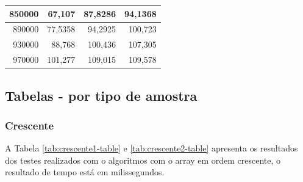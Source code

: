 \documentclass[a4paper, 12pt]{article}
\begin{document}
\begin{longtable}[c]{@{}rrrr@{}}
	\multicolumn{1}{|r|}{850000}                  & \multicolumn{1}{r|}{67,107}                 & \multicolumn{1}{r|}{87,8286}                & \multicolumn{1}{r|}{94,1368}                \\* \midrule
	\multicolumn{1}{|r|}{890000}                  & \multicolumn{1}{r|}{77,5358}                & \multicolumn{1}{r|}{94,2925}                & \multicolumn{1}{r|}{100,723}                \\* \midrule
	\multicolumn{1}{|r|}{930000}                  & \multicolumn{1}{r|}{88,768}                 & \multicolumn{1}{r|}{100,436}                & \multicolumn{1}{r|}{107,305}                \\* \midrule
	\multicolumn{1}{|r|}{970000}                  & \multicolumn{1}{r|}{101,277}                & \multicolumn{1}{r|}{109,015}                & \multicolumn{1}{r|}{109,578}                \\* \bottomrule
\end{longtable}

\newpage
\subsection{Tabelas - por tipo de amostra  }
		
\subsubsection{Crescente}
A Tabela \ref{tab:crescente1-table} e \ref{tab:crescente2-table}  apresenta os resultados dos testes realizados com o algoritmos com o array em ordem crescente, o resultado de tempo está em milissegundos.
\end{document}
